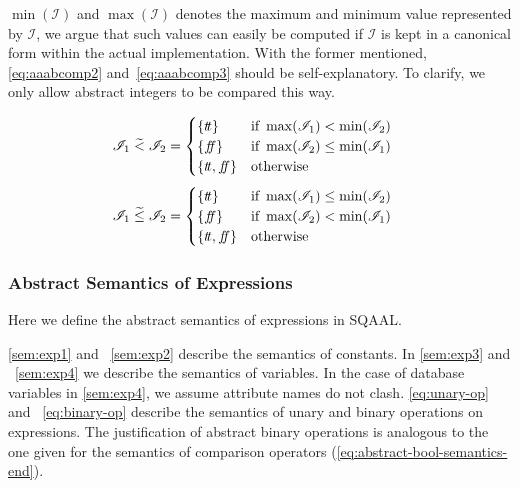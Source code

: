 $\min(\mathscr{I})$ and $\max(\mathscr{I})$ denotes the maximum and minimum value represented by $\mathscr{I}$, we argue that such values can easily be computed if $\mathscr{I}$ is kept in a canonical form within the actual implementation.
With the former mentioned, \autoref{eq:aaabcomp2} and~\ref{eq:aaabcomp3} should be self-explanatory.
To clarify, we only allow abstract integers to be compared this way.

\begin{align}\label{eq:aaabcomp2}
    \mathscr{I}_1 \;\aab{<}\; \mathscr{I}_2 &= \begin{cases}
        \{\true\} & \text{if } \max(\mathscr{I}_1) < \min(\mathscr{I}_2) \\
        \{\false\} & \text{if } \max(\mathscr{I}_2) \leq \min (\mathscr{I}_1) \\
        \{\true, \false\} & \text{otherwise}
    \end{cases}
\end{align}
\begin{align}\label{eq:aaabcomp3}
    \mathscr{I}_1 \;\aab{\leq}\; \mathscr{I}_2 &= \begin{cases}
        \{\true\} & \text{if } \max(\mathscr{I}_1) \leq \min(\mathscr{I}_2) \\
        \{\false\} & \text{if } \max(\mathscr{I}_2) < \min (\mathscr{I}_1) \\
        \{\true, \false\} & \text{otherwise}
    \end{cases}
\end{align}

\subsubsection{Abstract Semantics of Expressions}

Here we define the abstract semantics of expressions in SQAAL.

\autoref{sem:exp1} and ~\ref{sem:exp2} describe the semantics of constants.
In \autoref{sem:exp3} and ~\ref{sem:exp4} we describe the semantics of variables.
In the case of database variables in \autoref{sem:exp4}, we assume attribute names do not clash.
\autoref{eq:unary-op} and ~\ref{eq:binary-op} describe the semantics of unary and binary operations on expressions.
The justification of abstract binary operations is analogous to the one given for the semantics of comparison operators (\autoref{eq:abstract-bool-semantics-end}).

